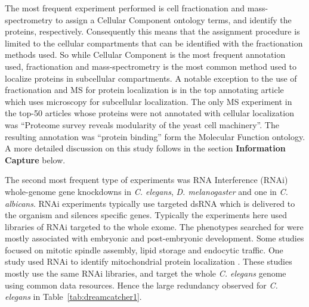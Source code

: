 \documentclass[12pt]{article}
\begin{document}
The most frequent experiment performed is cell fractionation and mass-spectrometry to assign a Cellular
Component ontology terms, and identify the proteins, respectively.  Consequently this means that the
assignment procedure is limited to the cellular compartments that can be identified with the
fractionation methods used. So while Cellular Component is the most frequent annotation used,
fractionation and mass-spectrometry is the most common method used to localize proteins in subcellular
compartments. A notable exception to the use of fractionation and MS for protein localization is in the
top annotating article \cite{pmid18029348} which uses microscopy for subcellular localization. The only
MS experiment in the top-50 articles whose proteins were not annotated with cellular localization was
``Proteome survey reveals modularity of the yeast cell machinery''\cite{pmid18029348}. The resulting
annotation was ``protein binding'' form the Molecular Function ontology. A more detailed discussion on
this study follows in the section \textbf{Information Capture} below.

The second most frequent type of experiments was RNA Interference (RNAi) whole-genome gene knockdowns
in \textit{C. elegans}, \textit{D. melanogaster} and one in \textit{C. albicans}.  RNAi experiments
typically use targeted dsRNA which is delivered to the organism and silences specific genes. Typically
the experiments here used libraries of RNAi targeted to the whole exome. The phenotypes searched for
were mostly associated with embryonic and post-embryonic development.  Some studies focused on mitotic
spindle assembly\cite{pmid17412918}, lipid storage\cite{pmid17412918} and endocytic
traffic\cite{pmid17412918}. One study used RNAi to identify mitochondrial protein localization
\cite{pmid18433294}. These studies mostly use the same RNAi libraries, and target the whole
\textit{C. elegans} genome using common data resources. Hence the large redundancy observed for
\textit{C. elegans} in Table~\ref{tab:dreamcatcher1}.


\end{document}
